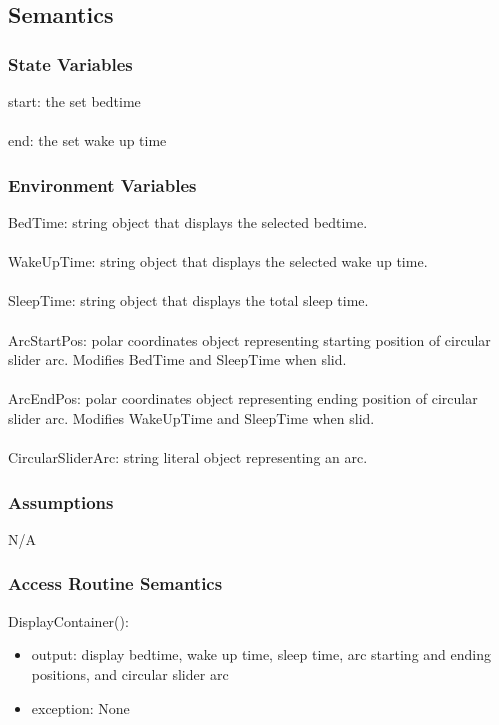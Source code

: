\documentclass[12pt, titlepage]{article}
\begin{document}
\subsection{Semantics}

\subsubsection{State Variables}
start: the set bedtime\\\\
end: the set wake up time

\subsubsection{Environment Variables}
BedTime: string object that displays the selected bedtime.\\\\
WakeUpTime: string object that displays the selected wake up time.\\\\
SleepTime: string object that displays the total sleep time.\\\\
ArcStartPos: polar coordinates object representing starting position of circular slider arc. Modifies BedTime and SleepTime when slid.\\\\
ArcEndPos: polar coordinates object representing ending position of circular slider arc. Modifies WakeUpTime and SleepTime when slid.\\\\
CircularSliderArc: string literal object representing an arc.
\subsubsection{Assumptions}

N/A

\subsubsection{Access Routine Semantics}

\noindent DisplayContainer():
\begin{itemize}
	\item output: display bedtime, wake up time, sleep time, arc starting and ending positions, and circular slider arc
	\item exception: None
\end{itemize}
\end{document}
